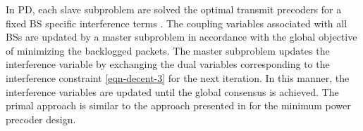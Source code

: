 
In \acl{PD}, each slave subproblem are solved the optimal transmit precoders for a fixed \ac{BS} specific interference terms . The coupling variables  associated with all \acp{BS} are updated by a master subproblem in accordance with the global objective of minimizing the backlogged packets. The master subproblem updates the interference variable  by exchanging the dual variables corresponding to the interference constraint \eqref{eqn-decent-3} for the next iteration. In this manner, the interference variables are updated until the global consensus is achieved. The primal approach is similar to the approach presented in \cite{pennanen2011decentralized} for the minimum power precoder design. 


\begin{comment}
The \acl{PD} approach decomposes the problem by fixing the interference variables \me{\zeta_{l,k,n,b} \forall k,b} in order to perform the precoder design independently across each \ac{BS}. Once the optimal precoders are designed at each \ac{BS} with the fixed interference constraints \eqref{eqn-decent-3}, the dual variables corresponding to the interference constraints are exchanged between the cooperating \acp{BS} in \me{\mc{B}} to update the interference variables \me{\zeta_{l,k,n,b}} for the next iteration until convergence. The primal approach is discussed extensively for the min-power problem in \cite{pennanen2011decentralized} and much of the current work follows similar approach. 

\subsubsection*{Convergence}
The convergence of the primal decomposition is similar to that of the centralized problem if the interference variables \me{\zeta_{l,k,n,b}} are allowed to converge to a stationary point. In practice, we can limit the number of exchanges to \me{J_{\max}} after which the \ac{SCA} update is performed until convergence or for \me{I_{\max}} times. The update of \me{\tilde{p}_{l,k,n}, \tilde{q}_{l,k,n}} and \me{\tilde{\beta}_{l,k,n}} can be made in conjunction with the receiver update \me{\mvec{W}{k,n}}. The receiver update can be made by using the precoded pilot transmission from each user as in \cite{komulainen2013effective}. 
\end{comment}